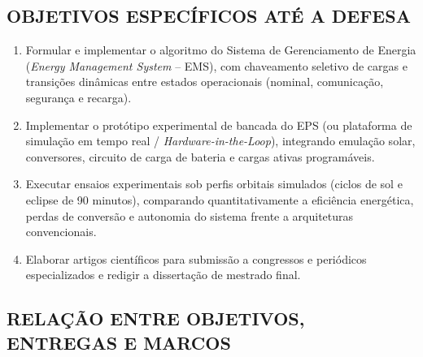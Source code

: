 \subsection{OBJETIVOS ESPECÍFICOS ATÉ A DEFESA}
\begin{enumerate}[label=\arabic*., resume]
    \item Formular e implementar o algoritmo do Sistema de Gerenciamento de Energia (\textit{Energy Management System} -- EMS), com chaveamento seletivo de cargas e transições dinâmicas entre estados operacionais (nominal, comunicação, segurança e recarga).
    \item Implementar o protótipo experimental de bancada do EPS (ou plataforma de simulação em tempo real / \textit{Hardware-in-the-Loop}), integrando emulação solar, conversores, circuito de carga de bateria e cargas ativas programáveis.
    \item Executar ensaios experimentais sob perfis orbitais simulados (ciclos de sol e eclipse de 90 minutos), comparando quantitativamente a eficiência energética, perdas de conversão e autonomia do sistema frente a arquiteturas convencionais.
    \item Elaborar artigos científicos para submissão a congressos e periódicos especializados e redigir a dissertação de mestrado final.
\end{enumerate}

\subsection{RELAÇÃO ENTRE OBJETIVOS, ENTREGAS E MARCOS}

